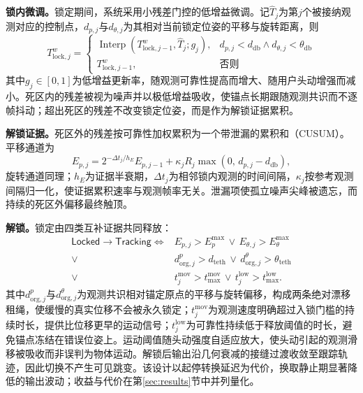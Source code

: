 \documentclass[review]{vgtc}
\begin{document}
\textbf{锁内微调。}锁定期间，系统采用小残差门控的低增益微调。记$\widehat{T}_j$为第$j$个被接纳观测对应的控制点，$d_{p,j}$与$d_{\theta,j}$为其相对当前锁定位姿的平移与旋转距离，则
\begin{equation}
T_{\mathrm{lock},j}^w = \begin{cases}
\operatorname{Interp}\!\left(T_{\mathrm{lock},j-1}^w, \widehat{T}_j; g_j\right), & d_{p,j} < d_{\mathrm{db}} \wedge d_{\theta,j} < \theta_{\mathrm{db}} \\
T_{\mathrm{lock},j-1}^w, & \text{否则}
\end{cases}
\label{eq:lock-creep}
\end{equation}
其中$g_j \in [0,1]$为低增益更新率，随观测可靠性提高而增大、随用户头动增强而减小。死区内的残差被视为噪声并以极低增益吸收，使锚点长期跟随观测共识而不逐帧抖动；超出死区的残差不改变锁定位姿，而是作为解锁证据累积。

\textbf{解锁证据。}死区外的残差按可靠性加权累积为一个带泄漏的累积和（CUSUM）。平移通道为
\begin{equation}
E_{p,j} = 2^{-\Delta t_j / h_E} E_{p,j-1} + \kappa_j R_j \max\!\left(0,\, d_{p,j} - d_{\mathrm{db}}\right),
\label{eq:cusum}
\end{equation}
旋转通道同理；$h_E$为证据半衰期，$\Delta t_j$为相邻锁内观测的时间间隔，$\kappa_j$按参考观测间隔归一化，使证据累积速率与观测帧率无关。泄漏项使孤立噪声尖峰被遗忘，而持续的死区外偏移最终触顶。

\textbf{解锁。}锁定由四类互补证据共同释放：
\begin{equation}
\begin{aligned}
\mathsf{Locked} \to \mathsf{Tracking} \iff{}
& E_{p,j} > E_p^{\max} \,\vee\, E_{\theta,j} > E_\theta^{\max} \\
\vee{}\;\; & d^{p}_{\mathrm{org},j} > d_{\mathrm{teth}} \,\vee\, d^{\theta}_{\mathrm{org},j} > \theta_{\mathrm{teth}} \\
\vee{}\;\; & t_j^{\mathrm{mov}} > t^{\mathrm{mov}}_{\max} \,\vee\, t_j^{\mathrm{low}} > t^{\mathrm{low}}_{\max}.
\end{aligned}
\label{eq:unlock}
\end{equation}
其中$d^{p}_{\mathrm{org},j}$与$d^{\theta}_{\mathrm{org},j}$为观测共识相对锚定原点的平移与旋转偏移，构成两条绝对漂移租绳，使缓慢的真实位移不会被永久锁定；$t_j^{\mathrm{mov}}$为观测速度明确超过入锁门槛的持续时长，提供比位移更早的运动信号；$t_j^{\mathrm{low}}$为可靠性持续低于释放阈值的时长，避免锚点冻结在错误位姿上。运动阈值随头动强度自适应放大，使头动引起的观测滑移被吸收而非误判为物体运动。解锁后输出沿几何衰减的接缝过渡收敛至跟踪轨迹，因此切换不产生可见跳变。该设计以起停转换延迟为代价，换取静止期显著降低的输出波动；收益与代价在第\ref{sec:results}节中并列量化。
\end{document}
